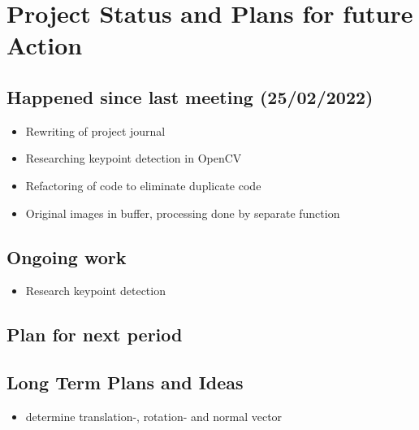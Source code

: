 \chapter{Project Status and Plans for future Action}

\section{Happened since last meeting (25/02/2022)}
\begin{itemize}
    \item Rewriting of project journal
    \item Researching keypoint detection in OpenCV
    \item Refactoring of code to eliminate duplicate code
    \item Original images in buffer, processing done by separate function
\end{itemize}
\section{Ongoing work}
\begin{itemize}
    \item Research keypoint detection
\end{itemize}
\section{Plan for next period}

\section{Long Term Plans and Ideas}
\begin{itemize}
    \item determine translation-, rotation- and normal vector
\end{itemize}